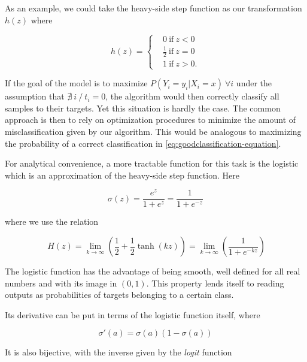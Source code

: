 As an example, we could take the heavy-side step function as our transformation $h(z)$ where

\begin{equation}
h(z) =
\begin{cases}
&0 \ \mbox{if} \ z<0 \\
&\frac{1}{2} \ \mbox{if} \ z=0 \\
&1 \ \mbox{if} \ z>0.
\end{cases}
\end{equation}

If the goal of the model is to maximize $P(Y_i = y_i | X_i = x) \ \forall i$
under the assumption that $\nexists\ i \ / \ t_i = 0$, the algorithm would then correctly classify all samples to their targets. Yet this situation is hardly the case. The common approach is then to rely on optimization procedures to minimize the amount of misclassification given by our algorithm. This would be analogous to maximizing the probability of a correct classification in \cref{eq:goodclassification-equation}.

For analytical convenience, a more tractable function for this task is the logistic which is an approximation of the heavy-side step function. Here

\begin{equation}\label{eq:logisticFunction}
\sigma(z) = \frac{e^{z}}{1 + e^{z}} = \frac{1}{1 + e^{-z}}
\end{equation}

where we use the relation

\begin{equation}
 \ H(z) = \lim_{k \to \infty} \left(\frac{1}{2} + \frac{1}{2}\tanh(kz) \right) = \lim_{k \to \infty} \left(\frac{1}{1+e^{-kz}} \right)
\end{equation}

The logistic function has the advantage of being smooth, well defined for all real numbers and with its image in $(0,1)$. This property lends itself to reading outputs as probabilities of targets belonging to a certain class.

 Its derivative can be put in terms of the logistic function itself, where

\begin{equation}\label{eq:derivativeLogisticFunction}
\sigma '(a) = \sigma(a)( 1 - \sigma(a) )
\end{equation}

It is also bijective, with the inverse given by the \textit{logit} function

